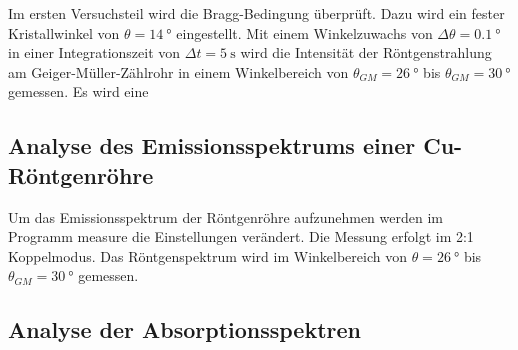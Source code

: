 Im ersten Versuchsteil wird die Bragg-Bedingung überprüft. Dazu wird ein fester Kristallwinkel von $\theta = \qty{14}{\degree}$ eingestellt.
Mit einem Winkelzuwachs von $\Delta\theta = \qty{0.1}{\degree}$ in einer Integrationszeit
von $\Delta t = \qty{5}{\second}$ wird die Intensität der Röntgenstrahlung am Geiger-Müller-Zählrohr in
einem Winkelbereich von $\theta_{GM} = \qty{26}{\degree}$ bis $\theta_{GM} = \qty{30}{\degree}$ gemessen.
Es wird eine 

\subsection{Analyse des Emissionsspektrums einer Cu-Röntgenröhre} %
\label{sub:Emission_durch}

Um das Emissionsspektrum der Röntgenröhre aufzunehmen werden im Programm measure die Einstellungen verändert.
Die Messung erfolgt im 2:1 Koppelmodus. Das Röntgenspektrum wird im Winkelbereich von $\theta = \qty{26}{\degree}$ bis $\theta_{GM} = \qty{30}{\degree}$ gemessen. 



\subsection{Analyse der Absorptionsspektren} %
\label{sub:Absorption_durch}

